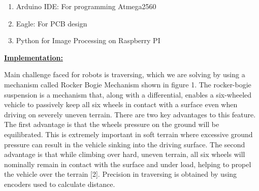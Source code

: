\documentclass[12pt]{article}
\begin{document}
\begin{enumerate}[label*={\fontsize{12pt}{12pt}\selectfont \arabic*.}]
	\item Arduino IDE: For programming Atmega2560\par

	\item Eagle: For PCB design\par

	\item Python for Image Processing on Raspberry PI
\end{enumerate}\par


\vspace{\baselineskip}

\vspace{\baselineskip}
\begin{adjustwidth}{0.5in}{0.52in}
{\fontsize{14pt}{16.8pt}\selectfont \textbf{\uline{Implementation:}}\par}\par

\end{adjustwidth}

\begin{adjustwidth}{0.5in}{0.52in}
\begin{justify}
Main challenge faced for robots is traversing, which we are solving by using a mechanism called Rocker Bogie Mechanism shown in figure 1. The rocker-bogie suspension is a mechanism that, along with a differential, enables a six-wheeled vehicle to passively keep all six wheels in contact with a surface even when driving on severely uneven terrain. There are two key advantages to this feature. The first advantage is that the wheels pressure on the ground will be equilibrated. This is extremely important in soft terrain where excessive ground pressure can result in the vehicle sinking into the driving surface. The second advantage is that while climbing over hard, uneven terrain, all six wheels will nominally remain in contact with the surface and under load, helping to propel the vehicle over the terrain [2]. Precision in traversing is obtained by using encoders used to calculate distance. 
\end{justify}\par

\end{adjustwidth}



\end{document}
